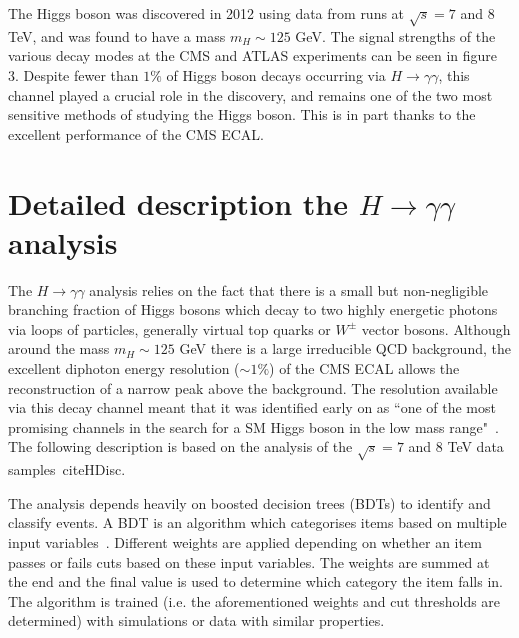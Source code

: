\documentclass[10pt]{article}
\begin{document}
The Higgs boson was discovered in 2012 using data from runs at $\sqrt{s}=7$ and $8$ TeV, and was found to have a mass $m_H \sim 125$ GeV. The signal strengths of the various decay modes at the CMS and ATLAS experiments can be seen in figure 3. Despite fewer than $1\%$ of Higgs boson decays occurring via $H \rightarrow \gamma \gamma$, this channel played a crucial role in the discovery, and remains one of the two most sensitive methods of studying the Higgs boson. This is in part thanks to the excellent performance of the CMS ECAL.

\section{Detailed description the $H \rightarrow \gamma \gamma$ analysis}

The $H \rightarrow \gamma \gamma$ analysis relies on the fact that there is a small but non-negligible branching fraction of Higgs bosons which decay to two highly energetic photons via loops of particles, generally virtual top quarks or $W^{\pm}$ vector bosons. Although around the mass $m_H \sim 125$ GeV there is a large irreducible QCD background, the excellent diphoton energy resolution ($\sim 1 \%$) of the CMS ECAL allows the reconstruction of a narrow peak above the background. The resolution available via this decay channel meant that it was identified early on as “one of the most promising channels in the search for a SM Higgs boson in the low mass range"~\cite{Seez}. The following description is based on the analysis of the $\sqrt{s}=7$ and $8$ TeV data samples~cite{HDisc}.

The analysis depends heavily on boosted decision trees (BDTs) to identify and classify events. A BDT is an algorithm which categorises items based on multiple input variables~\cite{BDT}. Different weights are applied depending on whether an item passes or fails cuts based on these input variables. The weights are summed at the end and the final value is used to determine which category the item falls in. The algorithm is trained (i.e. the aforementioned weights and cut thresholds are determined) with simulations or data with similar properties. %
\end{document}
